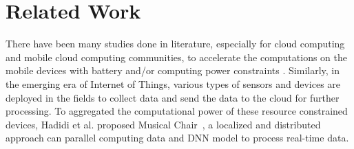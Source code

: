 \documentclass[format=acmsmall, review=false, screen=true]{acmart}
\begin{document}








\section{Related Work}
\label{sec:relatedwork}
There have been many studies done in literature, especially for cloud computing and mobile cloud computing communities, to accelerate the computations on the mobile devices with battery and/or computing power constraints \cite{Tu14,fernando2013mobile,Hung14,HungTWS15,yi2015fog,Tseng15,Silla14}. Similarly, in the emerging era of Internet of Things, various types of sensors and devices are deployed in the fields to collect data and send the data to the cloud for further processing. To aggregated the computational power of these resource constrained devices, Hadidi et al. proposed Musical Chair~\cite{hadidi2018musical}, a localized and distributed approach can parallel computing data and DNN model to process real-time data.
\end{document}
